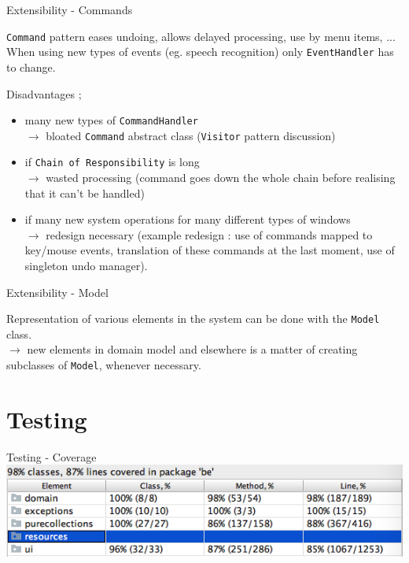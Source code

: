 \documentclass[10pt]{beamer}
\begin{document}
\begin{frame}[fragile]{Extensibility - Commands}
	\begin{center}
	\texttt{Command} pattern eases undoing, allows delayed processing, use by menu items, ... When using new types of events (eg. speech recognition) only \texttt{EventHandler} has to change.
	
	\vspace{0.5cm} Disadvantages ; 
	\begin{itemize}
	\item many new types of \texttt{CommandHandler} 
	\\ $\rightarrow$ bloated \texttt{Command} abstract class (\texttt{Visitor} pattern discussion)
	\item if \texttt{Chain of Responsibility} is long
	\\ $\rightarrow$ wasted processing (command goes down the whole chain before realising that it can't be handled)
	\item if many new system operations for many different types of windows 
	\\ $\rightarrow$ redesign necessary (example redesign : use of commands mapped to key/mouse events, translation of these commands at the last moment, use of singleton undo manager).
	\end{itemize}
	\end{center}
\end{frame}

\begin{frame}[fragile]{Extensibility - Model}
	\begin{center}
	Representation of various elements in the system can be done with the \texttt{Model} class.\\
	$\rightarrow $ new elements in domain model and elsewhere is a matter of creating subclasses of \texttt{Model}, whenever necessary.
	\end{center}
\end{frame}

\section{Testing}

\begin{frame}[fragile]{Testing - Coverage}
	\includegraphics[width=1\textwidth]{coverage}
\end{frame}
\end{document}
